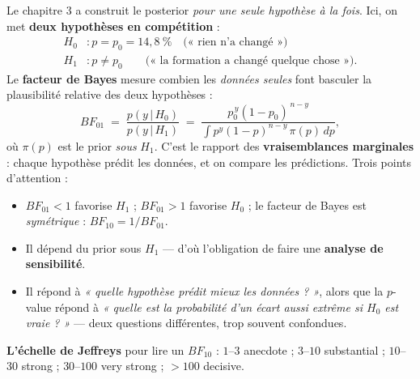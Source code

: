\documentclass[11pt,a4paper]{article}
\newcommand{\given}{\,\vert\,}
\begin{document}
\begin{rappel}
Le chapitre 3 a construit le posterior \emph{pour une seule hypothèse à la
fois}. Ici, on met \textbf{deux hypothèses en compétition} :
\begin{align*}
H_0 &: p = p_0 = 14{,}8~\% \quad \text{(« rien n'a changé »)}\\
H_1 &: p \ne p_0 \qquad \text{(« la formation a changé quelque chose »)}.
\end{align*}
Le \textbf{facteur de Bayes} mesure combien les \emph{données seules} font
basculer la plausibilité relative des deux hypothèses :
\[
BF_{01} \;=\; \frac{p(y \given H_0)}{p(y \given H_1)}
\;=\; \frac{p_0^{\,y}(1-p_0)^{\,n-y}}{\int p^{y}(1-p)^{n-y}\,\pi(p)\,dp},
\]
où $\pi(p)$ est le prior \emph{sous} $H_1$. C'est le rapport des \textbf{
vraisemblances marginales} : chaque hypothèse prédit les données, et on
compare les prédictions. Trois points d'attention :
\begin{itemize}[leftmargin=4mm, itemsep=0.5mm]
  \item $BF_{01} < 1$ favorise $H_1$ ; $BF_{01} > 1$ favorise $H_0$ ;
        le facteur de Bayes est \emph{symétrique} : $BF_{10} = 1/BF_{01}$.
  \item Il dépend du prior sous $H_1$ --- d'où l'obligation de faire une
        \textbf{analyse de sensibilité}.
  \item Il répond à \emph{« quelle hypothèse prédit mieux les données ? »},
        alors que la $p$-value répond à \emph{« quelle est la probabilité
        d'un écart aussi extrême si $H_0$ est vraie ? »} --- deux questions
        différentes, trop souvent confondues.
\end{itemize}
\textbf{L'échelle de Jeffreys} pour lire un $BF_{10}$ : $1$--$3$ anecdote ;
$3$--$10$ substantial ; $10$--$30$ strong ; $30$--$100$ very strong ;
$> 100$ decisive.
\end{rappel}
\end{document}
